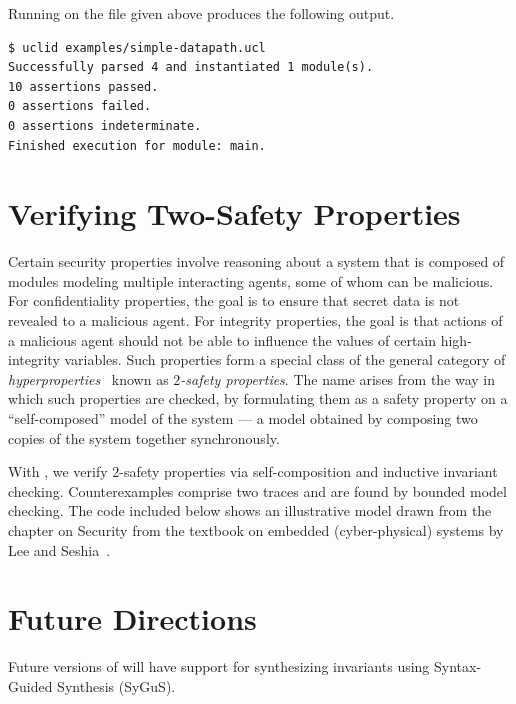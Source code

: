     


Running \uclid{} on the file given above produces the following output.

\begin{Verbatim}[frame=single, samepage=true]
$ uclid examples/simple-datapath.ucl
Successfully parsed 4 and instantiated 1 module(s).
10 assertions passed.
0 assertions failed.
0 assertions indeterminate.
Finished execution for module: main.
\end{Verbatim}

\section{Verifying Two-Safety Properties}

Certain security properties involve reasoning about a system
that is composed of modules modeling
multiple interacting agents, some of whom can be malicious. 
For confidentiality
properties, the goal is to ensure that secret data is not revealed to a malicious
agent. For integrity properties, the goal is that actions of a malicious agent
should not be able to influence the values of certain high-integrity variables.
Such properties form a special class of the general category of {\em hyperproperties}~\cite{clarkson-jcs10}
known as {\em $2$-safety properties}. The name arises from the way in which
such properties are checked, by formulating them as a safety property on a
``self-composed'' model of the system --- a model obtained by composing two
copies of the system together synchronously.

With \uclid{}, we verify $2$-safety properties via self-composition and
inductive invariant checking. Counterexamples comprise two traces
and are found by bounded model checking.
The code included below shows an
illustrative \uclid{} model drawn from the chapter on Security from the textbook
on embedded (cyber-physical) systems by Lee and Seshia~\cite{leeseshia-16}.

    

\section{Future Directions}

Future versions of \uclid{} will have support for synthesizing invariants using Syntax-Guided Synthesis (SyGuS).
